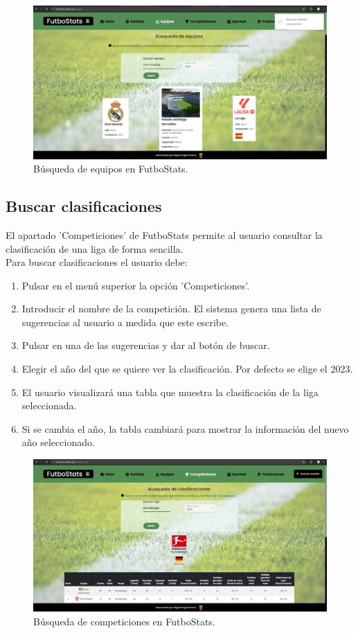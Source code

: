 \begin{figure}[H]
    \centering
    \includegraphics[width=1\linewidth]{img/busquedaEquipos.png}
    \caption{Búsqueda de equipos en FutboStats.}
    \label{fig:enter-label}
\end{figure}



\subsection{Buscar clasificaciones}
El apartado 'Competiciones' de FutboStats permite al usuario consultar la clasificación de una liga de forma sencilla. \\
Para buscar clasificaciones el usuario debe:
\begin{enumerate}
    \item Pulsar en el menú superior la opción 'Competiciones'.
    \item Introducir el nombre de la competición. El sistema genera una lista de sugerencias al usuario a medida que este escribe.
    \item Pulsar en una de las sugerencias y dar al botón de buscar.
    \item Elegir el año del que se quiere ver la clasificación. Por defecto se elige el 2023.
    \item El usuario visualizará una tabla que muestra la clasificación de la liga seleccionada.
    \item Si se cambia el año, la tabla cambiará para mostrar la información del nuevo año seleccionado.
\end{enumerate}

\begin{figure}[H]
    \centering
    \includegraphics[width=1\linewidth]{img/buscarCompeticiones.png}
    \caption{Búsqueda de competiciones en FutboStats.}
    \label{fig:enter-label}
\end{figure}

